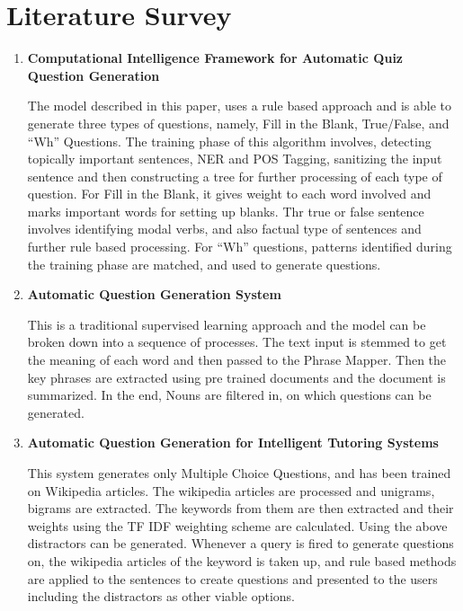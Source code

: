%

\chapter{Literature Survey}

\begin{enumerate}[align=left]

	\item \textbf{Computational Intelligence Framework for Automatic Quiz
		Question Generation}
		
		The model described in this paper, uses a rule based approach
		and is able to generate three types of questions, namely, Fill
		in the Blank, True/False, and “Wh” Questions. The training phase
		of this algorithm involves, detecting topically important
		sentences, NER and POS Tagging, sanitizing the input sentence
		and then constructing a tree for further processing of each type
		of question.  For Fill in the Blank, it gives weight to each
		word involved and marks important words for setting up blanks.
		Thr true or false sentence involves identifying modal verbs, and
		also factual type of sentences and further rule based
		processing. For “Wh” questions, patterns identified during the
		training phase are matched, and used to generate questions. 

\item \textbf{Automatic Question Generation System}
	
	This is a traditional supervised learning approach and the model can be
		broken down into a sequence of processes.  The text input is
		stemmed to get the meaning of each word and then passed to the
		Phrase Mapper. Then the key phrases are extracted using pre
		trained documents and the document is summarized. In the end,
		Nouns are filtered in, on which questions can be generated. 

\item \textbf{Automatic Question Generation for Intelligent Tutoring Systems}
	
	This system generates only Multiple Choice Questions, and has been
		trained on Wikipedia articles. The wikipedia articles are
		processed and unigrams, bigrams are extracted. The keywords from
		them are then extracted and their weights using the TF IDF
		weighting scheme are calculated. Using the above distractors can
		be generated. Whenever a query is fired to generate questions
		on, the wikipedia articles of the keyword is taken up, and rule
		based methods are applied to the sentences to create questions
		and presented to the users including the distractors as other
		viable options. 


\end{enumerate}
